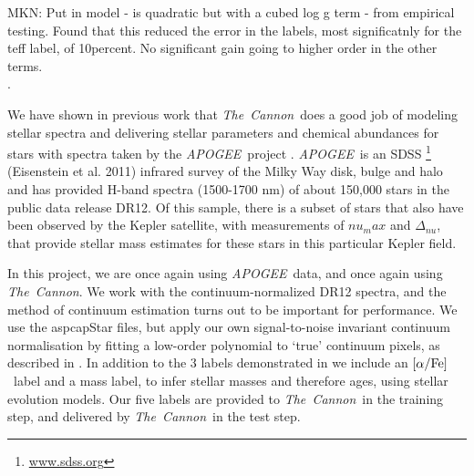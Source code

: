 \documentclass[12pt, preprint]{aastex}
\newcommand{\project}[1]{\textsl{#1}}
\newcommand{\tc}{\project{The~Cannon}}
\newcommand{\apogee}{\project{APOGEE}}
\newcommand{\aspcap}{\project{ASPCAP}}
\newcommand{\teff}{\mbox{$\rm T_{eff}$}}
\newcommand{\feh}{\mbox{$\rm [Fe/H]$}}
\newcommand{\alphafe}{\mbox{$\rm [\alpha/Fe]$}}
\newcommand{\logg}{\mbox{$\rm \log g$}}
\begin{document}
MKN: Put in model - is quadratic but with a cubed log g term - from empirical testing. Found that this reduced the error in the labels, most significatnly for the teff label, of 10percent. No significant gain going to higher order in the other terms. \\. 

We have shown in previous work \citep{Ness2015} that \tc\ does a good job
of modeling stellar spectra and delivering stellar parameters and
chemical abundances for stars with spectra taken by the \apogee\ project \citep{Majewski2012}.  \apogee\ is an SDSS \footnote{\url{www.sdss.org}} (Eisenstein et al. 2011) infrared survey of the Milky Way disk, bulge and halo and has provided H-band spectra (1500-1700 nm) of about 150,000 stars in the public data release DR12.  Of this sample, there is a subset of stars that also have been observed by the Kepler satellite, with measurements of ${nu}_max$ and $\Delta_{nu}$, that provide stellar mass estimates for these stars in this particular Kepler field. 



In this project, we are once again using \apogee\ data, and once again
using \tc. We work with the continuum-normalized DR12 spectra, and the method of continuum
estimation turns out to be important for performance. We use the aspcapStar files, but apply our own signal-to-noise invariant continuum normalisation by fitting a low-order polynomial to `true' continuum pixels, as described in \citet{Ness2015}. 
In addition to the 3 labels demonstrated in \citet{Ness2015} we include an \alphafe\ label and a mass label, to infer stellar masses and therefore ages, using stellar evolution models. Our five labels are provided to \tc\ in the training step, and delivered by
\tc\ in the test step.
\end{document}

